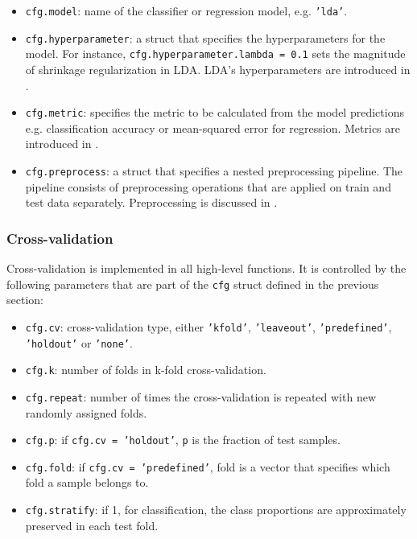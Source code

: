 \documentclass[utf8]{frontiersSCNS} %
\newcommand{\ttt}[1]{\texttt{#1}}
\begin{document}
\begin{itemize}
    \item \ttt{cfg.model}: name of the classifier or regression model, e.g. \ttt{'lda'}.
    \item \ttt{cfg.hyperparameter}: a struct that specifies the hyperparameters for the model. For instance, \ttt{cfg.hyperparameter.lambda = 0.1} sets the magnitude of shrinkage regularization in LDA. LDA's hyperparameters are introduced in .
    \item \ttt{cfg.metric}: specifies the metric to be calculated from the model predictions e.g. classification accuracy or mean-squared error for regression. Metrics are introduced in .
    \item \ttt{cfg.preprocess}: a struct that specifies a nested preprocessing pipeline. The pipeline consists of preprocessing operations that are applied on train and test data separately. Preprocessing is discussed in .
\end{itemize}



\subsubsection{Cross-validation}

Cross-validation is implemented in all high-level functions. It is controlled by the following parameters that are part of the \ttt{cfg} struct defined in the previous section:

\begin{itemize}
    \item \ttt{cfg.cv}: cross-validation type, either \ttt{'kfold'}, \ttt{'leaveout'}, \ttt{'predefined'}, \ttt{'holdout'} or \ttt{'none'}.
    \item \ttt{cfg.k}: number of folds in k-fold cross-validation.
    \item \ttt{cfg.repeat}: number of times the cross-validation is repeated with new randomly assigned folds.
    \item \ttt{cfg.p}: if \ttt{cfg.cv = 'holdout'}, \ttt{p} is the fraction of test samples.
    \item \ttt{cfg.fold}: if \ttt{cfg.cv = 'predefined'}, fold is a vector that  specifies which fold a sample belongs to.
    \item \ttt{cfg.stratify}: if 1, for classification, the class proportions are approximately preserved in each test fold.
\end{itemize}
\end{document}
